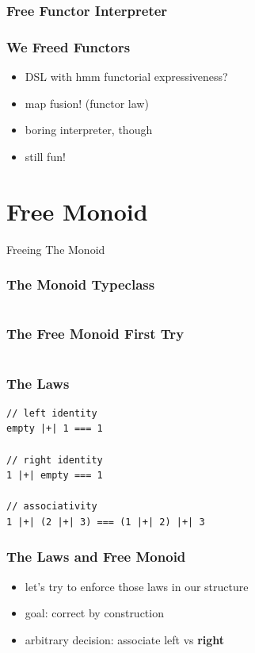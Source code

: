 \documentclass{beamer}
\begin{document}
\begin{frame}[fragile]
  \frametitle{Free Functor Interpreter}
\end{frame}

\begin{frame}
  \frametitle{We Freed Functors}
  \begin{itemize}
  \item<1-> DSL with hmm functorial expressiveness?
  \item<1-> map fusion! (functor law)
  \item<1-> boring interpreter, though
  \item<2-> still fun!
  \end{itemize}
\end{frame}

\section{Free Monoid}
\label{sec:free-monoid}

\begin{frame}
  \begin{center}
    \Huge
    Freeing The Monoid
  \end{center}
\end{frame}

\begin{frame}
  \frametitle{The Monoid Typeclass}
  \inputminted{scala}{snippets/monoid-typeclass.scala}
\end{frame}

\begin{frame}
  \frametitle{The Free Monoid \textemdash{} First Try}
  \inputminted{scala}{snippets/free-monoid-1.scala}
\end{frame}

\begin{frame}
  \frametitle{The Laws}
  \begin{verbatim}
// left identity
empty |+| 1 === 1

// right identity
1 |+| empty === 1

// associativity
1 |+| (2 |+| 3) === (1 |+| 2) |+| 3
  \end{verbatim}
\end{frame}

\begin{frame}
  \frametitle{The Laws and Free Monoid}
  \begin{itemize}
  \item let's try to enforce those laws in our structure
  \item goal: correct by construction
  \item arbitrary decision: associate left vs \textbf{right}
  \end{itemize}
\end{frame}
\end{document}
